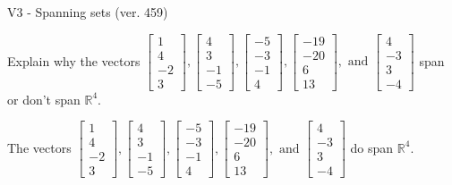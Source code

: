 \begin{exercise}
  \begin{exerciseTitle}V3 - Spanning sets (ver. 459)\end{exerciseTitle}
  \begin{exerciseStatement}
    Explain why the vectors \(\left[\begin{array}{r}
1 \\
4 \\
-2 \\
3
\end{array}\right] , \left[\begin{array}{r}
4 \\
3 \\
-1 \\
-5
\end{array}\right] , \left[\begin{array}{r}
-5 \\
-3 \\
-1 \\
4
\end{array}\right] , \left[\begin{array}{r}
-19 \\
-20 \\
6 \\
13
\end{array}\right] , \text{ and } \left[\begin{array}{r}
4 \\
-3 \\
3 \\
-4
\end{array}\right]\) span or don't span \(\mathbb{R}^4\). 
	


  \end{exerciseStatement}
  \begin{exerciseAnswer}
   The vectors \(\left[\begin{array}{r}
1 \\
4 \\
-2 \\
3
\end{array}\right] , \left[\begin{array}{r}
4 \\
3 \\
-1 \\
-5
\end{array}\right] , \left[\begin{array}{r}
-5 \\
-3 \\
-1 \\
4
\end{array}\right] , \left[\begin{array}{r}
-19 \\
-20 \\
6 \\
13
\end{array}\right] , \text{ and } \left[\begin{array}{r}
4 \\
-3 \\
3 \\
-4
\end{array}\right]\) 
  	 do  
	span \(\mathbb{R}^4\).
  



\end{exerciseAnswer}
\end{exercise}

